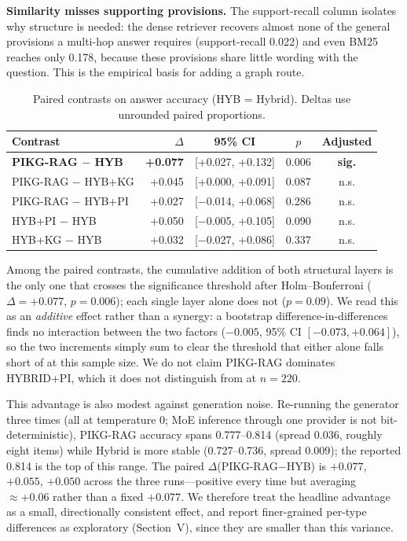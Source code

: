 \documentclass[conference]{IEEEtran}
\begin{document}
\textbf{Similarity misses supporting provisions.} The support-recall column isolates why structure is
needed: the dense retriever recovers almost none of the general provisions a multi-hop answer
requires (support-recall 0.022) and even BM25 reaches only 0.178, because these provisions share
little wording with the question. This is the empirical basis for adding a graph route.

\begin{table}[t]
\caption{Paired contrasts on answer accuracy (HYB = Hybrid). Deltas use unrounded paired proportions.}
\label{tab:contrasts}
\centering
\footnotesize
\setlength{\tabcolsep}{3pt}
\begin{tabular}{@{}lrccc@{}}
\hline
\textbf{Contrast} & $\Delta$ & \textbf{95\% CI} & $p$ & \textbf{Adjusted} \\
\hline
\textbf{PIKG-RAG $-$ HYB} & \textbf{+0.077} & [+0.027, +0.132] & 0.006 & \textbf{sig.} \\
PIKG-RAG $-$ HYB+KG & +0.045 & [+0.000, +0.091] & 0.087 & n.s. \\
PIKG-RAG $-$ HYB+PI & +0.027 & [$-$0.014, +0.068] & 0.286 & n.s. \\
HYB+PI $-$ HYB & +0.050 & [$-$0.005, +0.105] & 0.090 & n.s. \\
HYB+KG $-$ HYB & +0.032 & [$-$0.027, +0.086] & 0.337 & n.s. \\
\hline
\end{tabular}
\end{table}

Among the paired contrasts, the cumulative addition of both structural layers is the only one that
crosses the significance threshold after Holm--Bonferroni ($\Delta=+0.077$, $p=0.006$); each single
layer alone does not ($p=0.09$). We read this as an \emph{additive} effect rather than a synergy: a
bootstrap difference-in-differences finds no interaction between the two factors
($-0.005$, 95\% CI $[-0.073,+0.064]$), so the two increments simply sum to clear the threshold that
either alone falls short of at this sample size. We do not claim PIKG-RAG dominates HYBRID+PI, which
it does not distinguish from at $n=220$.

This advantage is also modest against generation noise. Re-running the generator three times (all at
temperature 0; MoE inference through one provider is not bit-deterministic), PIKG-RAG accuracy spans
0.777--0.814 (spread 0.036, roughly eight items) while Hybrid is more stable (0.727--0.736, spread
0.009); the reported 0.814 is the top of this range. The paired $\Delta$(PIKG-RAG$-$HYB) is
$+0.077$, $+0.055$, $+0.050$ across the three runs---positive every time but averaging $\approx+0.06$
rather than a fixed $+0.077$. We therefore treat the headline advantage as a small, directionally
consistent effect, and report finer-grained per-type differences as exploratory (Section~V), since
they are smaller than this variance.
\end{document}
